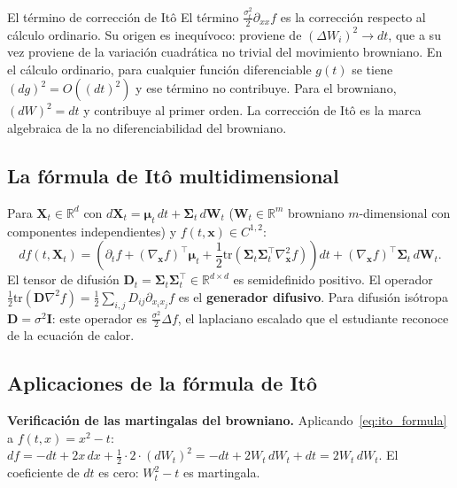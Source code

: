 \begin{observacion}{El término de corrección de Itô}
El término $\frac{\sigma_t^2}{2}\partial_{xx}f$ es la corrección respecto
al cálculo ordinario. Su origen es inequívoco: proviene de $(\Delta W_i)^2
\to dt$, que a su vez proviene de la variación cuadrática no trivial del
movimiento browniano. En el cálculo ordinario, para cualquier función
diferenciable $g(t)$ se tiene $(dg)^2 = O((dt)^2)$ y ese término no contribuye.
Para el browniano, $(dW)^2 = dt$ y contribuye al primer orden. La corrección
de Itô es la marca algebraica de la no diferenciabilidad del browniano.
\end{observacion}

\subsection{La fórmula de Itô multidimensional}
\label{subsec:ito_multi}

Para $\bm{X}_t \in \mathbb{R}^d$ con $d\bm{X}_t = \bm{\mu}_t\,dt +
\bm{\Sigma}_t\,d\bm{W}_t$ ($\bm{W}_t \in \mathbb{R}^m$ browniano $m$-dimensional
con componentes independientes) y $f(t,\bm{x}) \in C^{1,2}$:
\begin{equation}
  df(t,\bm{X}_t)
  = \left(\partial_t f
    + (\nabla_{\bm{x}} f)^\top\bm{\mu}_t
    + \frac{1}{2}\mathrm{tr}\!\left(\bm{\Sigma}_t\bm{\Sigma}_t^\top
    \nabla^2_{\bm{x}} f\right)\right)dt
    + (\nabla_{\bm{x}} f)^\top\bm{\Sigma}_t\,d\bm{W}_t.
  \label{eq:ito_multi}
\end{equation}
El tensor de difusión $\bm{D}_t = \bm{\Sigma}_t\bm{\Sigma}_t^\top \in
\mathbb{R}^{d\times d}$ es semidefinido positivo. El operador
$\frac{1}{2}\mathrm{tr}(\bm{D}\nabla^2 f) = \frac{1}{2}\sum_{i,j} D_{ij}
\partial_{x_i x_j} f$ es el \textbf{generador difusivo}. Para difusión
isótropa $\bm{D} = \sigma^2\bm{I}$: este operador es $\frac{\sigma^2}{2}\Delta f$,
el laplaciano escalado que el estudiante reconoce de la ecuación de calor.

\subsection{Aplicaciones de la fórmula de Itô}
\label{subsec:ito_aplicaciones}

\medskip
\noindent\textbf{Verificación de las martingalas del browniano.}
Aplicando~\eqref{eq:ito_formula} a $f(t,x) = x^2 - t$:
$df = -dt + 2x\,dx + \frac{1}{2}\cdot 2\cdot(dW_t)^2 = -dt + 2W_t\,dW_t + dt
= 2W_t\,dW_t$. El coeficiente de $dt$ es cero: $W_t^2 - t$ es martingala.

